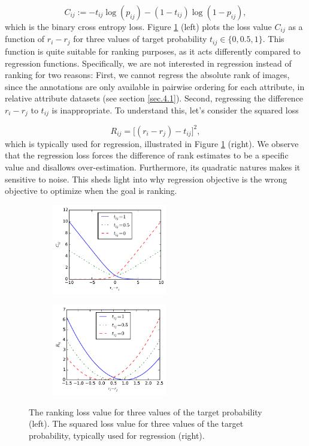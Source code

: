 \begin{equation}
C_{ij} := - t_{ij} \log (p_{ij}) - (1 - t_{ij}) \log (1 - p_{ij}),
\label{eq2}
\end{equation}
which is the binary cross entropy loss.
Figure \ref{fig.2} (left) plots the loss value $C_{ij}$ as a function of $r_i - r_j$ for three values of target probability $t_{ij} \in \{0, 0.5, 1\}$. This function is quite suitable for ranking purposes, as it acts differently compared to regression functions.
Specifically, we are not interested in regression instead of ranking for two reasons: First, we cannot regress the absolute rank of images, since the annotations are only available in pairwise ordering for each attribute, in relative attribute datasets (see section \ref{sec.4.1}). Second, regressing the difference $r_i - r_j$ to $t_{ij}$ is inappropriate. To understand this, let's consider the squared loss

\begin{equation}
R_{ij} = \big[(r_i - r_j) - t_{ij}\big]^2,
\end{equation}
which is typically used for regression, illustrated in Figure \ref{fig.2} (right). We observe that the regression loss forces the difference of rank estimates to be a specific value and disallows over-estimation. Furthermore, its quadratic natures makes it %
sensitive to noise. This sheds light into why regression objective is the wrong objective to optimize when the goal is ranking.

\begin{figure}
    \centering
    \begin{subfigure}
        \centering
        \includegraphics[width=5cm]{fig2-2/fig3.pdf}
    \end{subfigure}
    \begin{subfigure}
        \centering
        \includegraphics[width=5cm]{fig2-2/fig3-reg.pdf}
    \end{subfigure}
    \caption{The ranking loss value for three values of the target probability (left). The squared loss value for three values of the target probability, typically used for regression (right).}
    \label{fig.2}
\end{figure}

